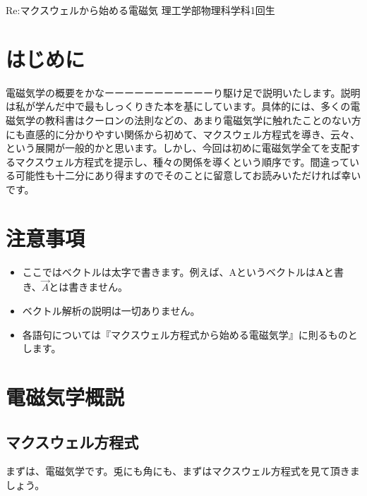 \documentclass[10pt,b5paper,papersize,dvipdfmx]{jsbook}
\begin{document}


\kaishititle%
  {Re:マクスウェルから始める電磁気}%
  {理工学部物理科学科1回生}%
  {}%

\section*{はじめに}
電磁気学の概要をかなーーーーーーーーーーーり駆け足で説明いたします。説明は私が学んだ中で最もしっくりきた本を基にしています。具体的には、多くの電磁気学の教科書はクーロンの法則などの、あまり電磁気学に触れたことのない方にも直感的に分かりやすい関係から初めて、マクスウェル方程式を導き、云々、という展開が一般的かと思います。しかし、今回は初めに電磁気学全てを支配するマクスウェル方程式を提示し、種々の関係を導くという順序です。間違っている可能性も十二分にあり得ますのでそのことに留意してお読みいただければ幸いです。

\section{注意事項}
\begin{itemize}
\item ここではベクトルは太字で書きます。例えば、Aというベクトルは$\mathbf{A}$と書き、$\vec{A}$とは書きません。
\item ベクトル解析の説明は一切ありません。
\item 各語句については『マクスウェル方程式から始める電磁気学』に則るものとします。
\end{itemize}

\section{電磁気学概説}
\subsection{マクスウェル方程式}
まずは、電磁気学です。兎にも角にも、まずはマクスウェル方程式を見て頂きましょう。
\end{document}
